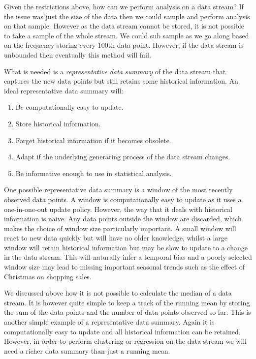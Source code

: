 Given the restrictions above, how can we perform analysis on a data stream? If the issue was just the size of the data then we could sample and perform analysis on that sample. However as the data stream cannot be stored, it is not possible to take a sample of the whole stream. We could sub sample as we go along based on the frequency storing every 100th data point. However, if the data stream is unbounded then eventually this method will fail.

What is needed is a \textit{representative data summary} of the data stream that captures the new data points but still retains some historical information. An ideal representative data summary will:

\begin{enumerate}
\item Be computationally easy to update.
\item Store historical information.
\item Forget historical information if it becomes obsolete.
\item Adapt if the underlying generating process of the data stream changes.
\item Be informative enough to use in statistical analysis.
\end{enumerate}

One possible representative data summary is a window of the most recently observed data points. A window is computationally easy to update as it uses a one-in-one-out update policy. However, the way that it deals with historical information is naive. Any data points outside the window are discarded, which makes the choice of window size particularly important.  A small window will react to new data quickly but will have no older knowledge, whilst a large window will retain historical information but may be slow to update to a change in the data stream.  This will naturally infer a temporal bias and a poorly selected window size may lead to missing important seasonal trends such as the effect of Christmas on shopping sales. 

We discussed above how it is not possible to calculate the median of a data stream. It is however quite simple to keep a track of the running mean by  storing the sum of the data points and the number of data points observed so far. This is another simple example of a representative data summary.  Again it is computationally easy to update and all historical information can be retained. However, in order to perform clustering or regression on the data stream we will need a richer data summary than just a running mean. 

